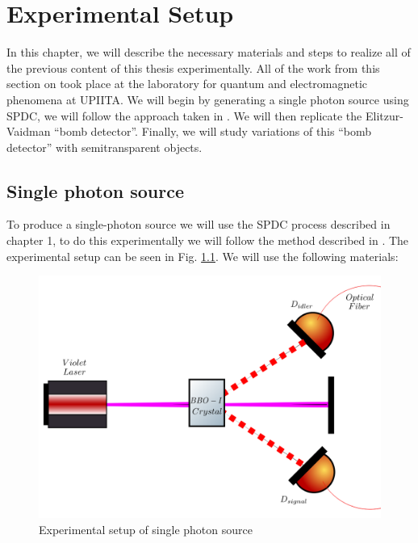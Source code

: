 \documentclass{book}
\begin{document}
\pagebreak







\pagebreak
\chapter{Experimental Setup}
In this chapter, we will describe the necessary materials and steps to realize all of the previous content of this thesis experimentally. All of the work from this section on took place at the laboratory for quantum and electromagnetic phenomena at UPIITA. We will begin by generating a single photon source using SPDC, we will follow the approach taken in \cite{maestria_procopio}. We will then replicate the Elitzur-Vaidman ``bomb detector''. Finally, we will study variations of this ``bomb detector'' with semitransparent objects.

\section{Single photon source}

To produce a single-photon source we will use the SPDC process described in chapter 1, to do this experimentally we will follow the method described in \cite{maestria_procopio}. The experimental setup can be seen in Fig. \ref{single}.  We will use the following materials:

\begin{figure}[!htb]
\centering
\includegraphics[width=\linewidth]{images/SPDC_exp.png}
\caption{Experimental setup of single photon source}
\label{single}
\end{figure}
\end{document}
